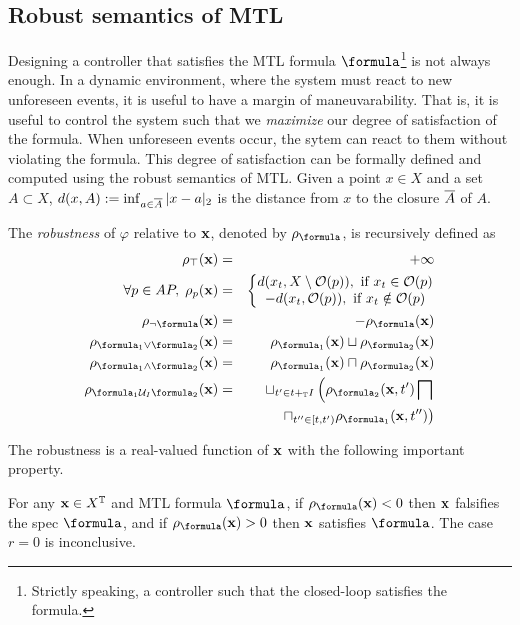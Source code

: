 \subsection{Robust semantics of MTL}
\label{sec:rob sem}
Designing a controller that satisfies the MTL formula $\formula$\footnote{Strictly speaking, a controller such that the closed-loop satisfies the formula.} is not always enough.
In a dynamic environment, where the system must react to new unforeseen events, it is useful to have a margin of maneuvarability.
That is, it is useful to control the system such that we \textit{maximize} our degree of satisfaction of the formula.
When unforeseen events occur, the sytem can react to them without violating the formula.
This degree of satisfaction can be formally defined and computed using the robust semantics of MTL.
Given a point $x \in X$ and a set $A \subset X$, $d(x,A) := \inf_{a \in \overline{A}}|x-a|_2$ is the distance from $x$  to the closure $\overline{A}$ of $A$.
\begin{definition}
	\label{def:robustness estimate}
	The \emph{robustness} of $\varphi$ relative to $\mathbf{x}$, denoted by $ \robf$, is recursively defined as 
	\begin{eqnarray*}
		\label{eq:robustness estimate}
		\rob_{\top} (\sstraj) &=& +\infty
		\\
		\forall p \in AP, \;  \rob_{p} (\sstraj) &=& \left \lbrace \begin{matrix}
			d(\stPt_t, \stSet \setminus \Oc(p)), \text{ if } \stPt_t \in \Oc(p)
			\\
			-d(\stPt_t, \Oc(p)), \text{ if } \stPt_t \notin \Oc(p)			
		\end{matrix} \right.
		\\
		\rob_{\lnot \formula} (\sstraj) &=& - \rob_{\formula} (\sstraj)
		\\
		\rob_{ \formula_1 \lor \formula_2} (\sstraj) &=& \rob_{\formula_1} (\sstraj) \sqcup \rob_{\formula_2} (\sstraj) 
		\\
		\rob_{ \formula_1 \land \formula_2} (\sstraj) &=& \rob_{\formula_1} (\sstraj) \sqcap \rob_{\formula_2} (\sstraj) 
		\\
		\rob_{ \formula_1 \until_I \formula_2} (\sstraj) &=& \sqcup_{t' \in t+_{\TDom}I} \left(\rob_{\formula_2} (\sstraj,t') \bigsqcap \right.
		\\
		&& \left. \sqcap_{t'' \in [t,t')}   \rob_{\formula_1} (\sstraj,t'') \right) 
	\end{eqnarray*}
\end{definition}
The robustness is a real-valued function of $\mathbf{x}$ with the following important property.
\begin{theorem} \cite{FainekosP09tcs}
	\label{thm:rob objective}
	For any $\mathbf{x} \in X^{\mathbb{T}}$ and MTL formula $\formula$, 
	if $\robf(\sstraj) <0$ then $\mathbf{x}$ falsifies the spec $\formula$, and if $\robf(\sstraj) > 0$ then $\mathbf{x}$ satisfies $\formula$. 
	The case $r =0$ is inconclusive.
\end{theorem} 

